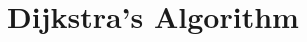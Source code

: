 \documentclass[../maths.tex]{subfiles}
\begin{document}
\chapter{Dijkstra's Algorithm}
\end{document}
